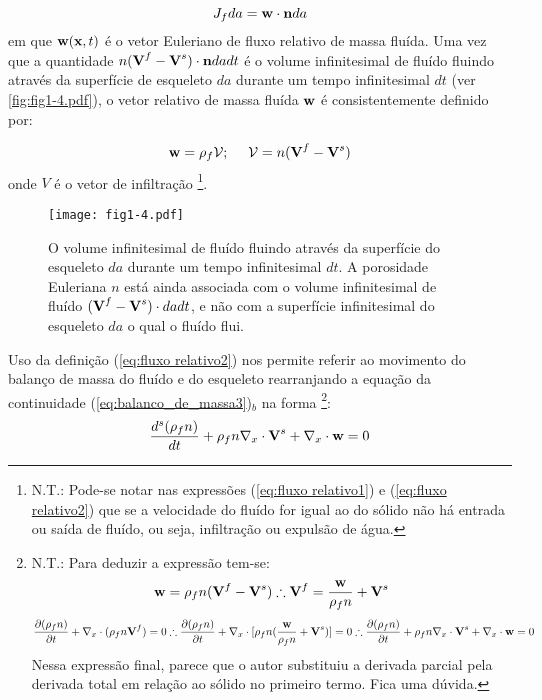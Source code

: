 \documentclass[
	11pt, %
	fleqn, %
	a4paper, %
]{LegrandOrangeBook}
\begin{document}
\begin{equation}
	\label{eq:fluxo relativo1}	J_fda = \textbf{w} \cdot \textbf{n} da
\end{equation}
em que $\textbf{w}(\textbf{x},t)$ é o vetor Euleriano de fluxo relativo de massa fluída. Uma vez que a quantidade $n(\textbf{V}^f-\textbf{V}^s)\cdot \textbf{n} dadt$ é o volume infinitesimal de fluído fluindo através da superfície de esqueleto $da$ durante um tempo infinitesimal $dt$ (ver \autoref{fig:fig1-4.pdf}), o vetor relativo de massa fluída $\textbf{w}$ é consistentemente definido por:

\begin{equation}
	\label{eq:fluxo relativo2}	
	\textbf{w} = \rho_f \mathcal{V}; ~~~~ \mathcal{V} = n(\textbf{V}^f-\textbf{V}^s)
\end{equation}
onde $V$ é o vetor de infiltração \footnote{N.T.: Pode-se notar nas expressões (\ref{eq:fluxo relativo1}) e (\ref{eq:fluxo relativo2}) que se a velocidade do fluído for igual ao do sólido não há entrada ou saída de fluído, ou seja, infiltração ou expulsão de água.}. 

\begin{figure}[H] %
	\centering %
	\texttt{[image: fig1-4.pdf]} %
	\caption{O volume infinitesimal de fluído fluindo através da superfície do esqueleto $da$ durante um tempo infinitesimal $dt$. A porosidade Euleriana $n$ está ainda associada com o volume infinitesimal de fluído $(\textbf{V}^f-\textbf{V}^s)\cdot dadt$, e não com a superfície infinitesimal do esqueleto $da$ o qual o fluído flui.}
	\label{fig:fig1-4.pdf} %
\end{figure}
Uso da definição (\ref{eq:fluxo relativo2}) nos permite referir ao movimento do balanço de massa do fluído e do esqueleto rearranjando a equação da continuidade (\ref{eq:balanco_de_massa3})$_b$ na forma \footnote{N.T.: Para deduzir a expressão tem-se:
\begin{displaymath}	
	\textbf{w} = \rho_fn(\textbf{V}^f - \textbf{V}^s) \therefore \textbf{V}^f = \dfrac{\textbf{w}}{\rho_fn}+\textbf{V}^s
\end{displaymath}	
\begin{displaymath}	
	\dfrac{\partial(\rho_fn)}{\partial t} + \nabla_x \cdot (\rho_fn\textbf{V}^f)=0 \therefore \dfrac{\partial(\rho_fn)}{\partial t} + \nabla_x \cdot [\rho_fn(\dfrac{\textbf{w}}{\rho_fn}+\textbf{V}^s)]=0 \therefore \dfrac{\partial(\rho_fn)}{\partial t}+\rho_fn\nabla_x \cdot \textbf{V}^s + \nabla_x \cdot \textbf{w} = 0 
\end{displaymath}	
Nessa expressão final, parece que o autor substituiu a derivada parcial pela derivada total em relação ao sólido no primeiro termo. Fica uma dúvida.}:
\begin{equation}
	\label{eq:fluxo relativo3}	
	\dfrac{d^s(\rho_fn)}{dt}+\rho_fn\nabla_x \cdot \textbf{V}^s + \nabla_x \cdot \textbf{w} = 0 
\end{equation}
\end{document}
